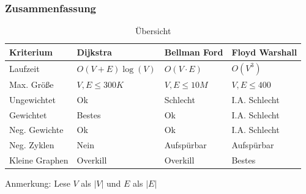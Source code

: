 \begin{frame}
\frametitle{Zusammenfassung}
\small{\begin{table}
\begin{tabular}{l l l l}
\toprule
\textbf{Kriterium} & \textbf{Dijkstra} & \textbf{Bellman Ford} &\textbf{Floyd Warshall}\\
\midrule
Laufzeit & $O(V+E)\log(V)$ & $O(V \cdot E)$ & $O(V^3)$ \\
Max. Größe  & $V,E \leq 300K$ & $V,E \leq 10M$ & $V,E \leq 400$ \\
Ungewichtet & Ok & Schlecht & I.A. Schlecht \\
Gewichtet & Bestes & Ok & I.A. Schlecht \\
Neg. Gewichte & Ok & Ok & I.A. Schlecht \\
Neg. Zyklen & Nein & Aufspürbar & Aufspürbar \\
Kleine Graphen & Overkill & Overkill & Bestes \\
\bottomrule
\end{tabular}
\caption{Übersicht}
\end{table}}
Anmerkung: Lese $V$ als $|V|$ und $E$ als $|E|$
\end{frame}


